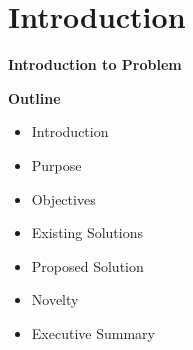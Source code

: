 \documentclass{article}
\begin{document}
\pagebreak

\tableofcontents
\pagebreak


\section{Introduction}

\vspace{20mm}

\Huge{\textbf{Introduction to Problem}}

\vspace{20mm}


\begin{abstract}
	\blindtext
\end{abstract}

\vspace{20mm}

\large{\textbf{Outline}}

\begin{center}
	\begin{itemize}
		\item Introduction
		\item Purpose
		\item Objectives
		\item Existing Solutions
		\item Proposed Solution
		\item Novelty
		\item Executive Summary
	\end{itemize}
\end{center}
\end{document}
